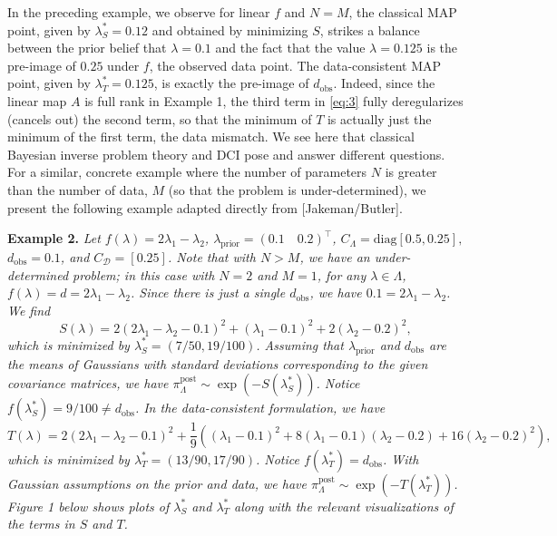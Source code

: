 \documentclass{amsart}
\begin{document}
\vspace{.125cm}

In the preceding example, we observe for linear $f$ and $N=M$, the classical MAP point, given by $\lambda_S^*=0.12$ and obtained by minimizing $S$, strikes a balance between the prior belief that $\lambda=0.1$ and the fact that the value $\lambda=0.125$ is the pre-image of $0.25$ under $f$, the observed data point. The data-consistent MAP point, given by $\lambda_T^*=0.125$, is exactly the pre-image of $d_\text{obs}$. Indeed, since the linear map $A$ is full rank in Example 1, the third term in \eqref{eq:3} fully deregularizes (cancels out) the second term, so that the minimum of $T$ is actually just the minimum of the first term, the data mismatch. We see here that classical Bayesian inverse problem theory and DCI pose and answer different questions. For a similar, concrete example where the number of parameters $N$ is greater than the number of data, $M$ (so that the problem is under-determined), we present the following example adapted directly from [Jakeman/Butler].


\vspace{.125cm} 

\noindent \textbf{Example 2.} \textit{Let $f(\lambda)=2\lambda_1-\lambda_2$, $\lambda_\text{prior}=(0.1 \quad 0.2)^\top$, $C_\Lambda=\text{diag}[0.5,0.25],$ $d_\text{obs}=0.1$, and $C_\mathcal{D}=[0.25]$. Note that with $N>M$, we have an under-determined problem; in this case with $N=2$ and $M=1$, for any $\lambda \in \Lambda$, $f(\lambda)=d=2\lambda_1-\lambda_2$. Since there is just a single $d_\text{obs}$, we have $0.1=2\lambda_1-\lambda_2$.
We find $$S(\lambda)=2(2\lambda_1-\lambda_2-0.1)^2+(\lambda_1-0.1)^2+2(\lambda_2-0.2)^2,$$ 
which is minimized by $\lambda^*_S=(7/50,19/100)$. 
Assuming that $\lambda_\text{prior}$ and $d_\text{obs}$ are the means of Gaussians with standard deviations corresponding to the given covariance matrices, we have $\pi_\Lambda^\text{post} \sim \exp(-S(\lambda_S^*))$. 
Notice $f(\lambda^*_S)=9/100\neq d_\text{obs}$. In the data-consistent formulation, we have 
$$T(\lambda)=2(2\lambda_1-\lambda_2-0.1)^2+\frac{1}{9}\left((\lambda_1-0.1)^2+8(\lambda_1-0.1)(\lambda_2-0.2)+16(\lambda_2-0.2)^2\right),$$ 
which is minimized by $\lambda^*_T=(13/90,17/90)$. Notice $f(\lambda^*_T)=d_\text{obs}$. With Gaussian assumptions on the prior and data, we have $\pi_\Lambda^\text{post} \sim \exp(-T(\lambda_T^*))$. Figure 1 below shows plots of $\lambda_S^*$ and $\lambda_T^*$ along with the relevant visualizations of the terms in $S$ and $T$.} 
\end{document}

